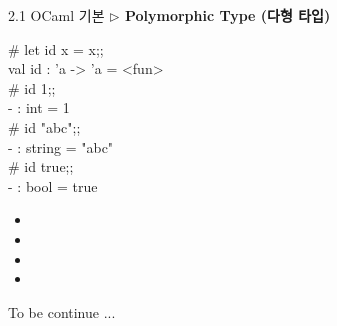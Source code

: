\documentclass[10pt]{beamer}
\begin{document}
	\begin{frame}{2.1 OCaml 기본}
		\textbf{$\triangleright$ Polymorphic Type (다형 타입)}
		
		\begin{tcolorbox}[colback=backcolor]\ttfamily
			\# let id x = x;; \\
			val id : 'a -> 'a = <fun> \\
			\# id 1;; \\
			- : int = 1 \\
			\# id "abc";; \\
			- : string = "abc" \\
			\# id true;; \\
			- : bool = true
		\end{tcolorbox}
		\begin{itemize}
			\item[]
			\item[]
			\item[]
			\item[]
		\end{itemize}
	\end{frame}
	
	\newpage
	{
		\begin{frame}[standout]
			To be continue ...
		\end{frame}
	}
	
	
\end{document}
